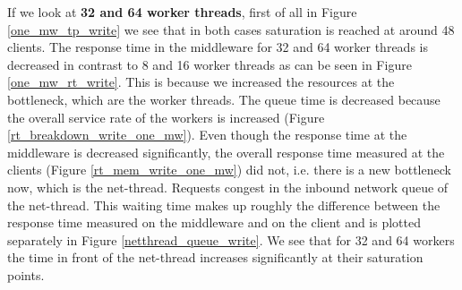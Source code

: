 If we look at \textbf{32 and 64 worker threads}, first of all in Figure \ref{one_mw_tp_write} we see that in both cases saturation is reached at around 48 clients. The response time in the middleware for 32 and 64 worker threads is decreased in contrast to 8 and 16 worker threads as can be seen in Figure \ref{one_mw_rt_write}. This is because we increased the resources at the bottleneck, which are the worker threads. The queue time is decreased because the overall service rate of the workers is increased (Figure \ref{rt_breakdown_write_one_mw}).
Even though the response time at the middleware is decreased significantly, the overall response time measured at the clients (Figure \ref{rt_mem_write_one_mw}) did not, i.e. there is a new bottleneck now, which is the net-thread. Requests congest in the inbound network queue of the net-thread. 
This waiting time makes up roughly the difference between the response time measured on the middleware and on the client and is plotted separately in Figure \ref{netthread_queue_write}. We see that for 32 and 64 workers the time in front of the net-thread increases significantly at their saturation points.

